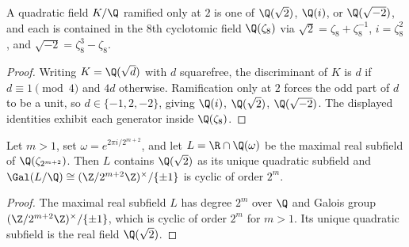 \begin{lemma}
  \label{lem:quadratic-ram-two}
  A quadratic field $K/\Q$ ramified only at $2$ is one of $\Q(\sqrt 2)$,
  $\Q(i)$, or $\Q(\sqrt{-2})$, and each is contained in the $8$th cyclotomic
  field $\Q(\zeta_8)$ via $\sqrt 2 = \zeta_8 + \zeta_8^{-1}$, $i = \zeta_8^2$,
  and $\sqrt{-2} = \zeta_8^3 - \zeta_8$.
\end{lemma}
\begin{proof}
  Writing $K = \Q(\sqrt d)$ with $d$ squarefree, the discriminant of $K$ is $d$
  if $d \equiv 1 \pmod 4$ and $4d$ otherwise. Ramification only at $2$ forces
  the odd part of $d$ to be a unit, so $d \in \{-1, 2, -2\}$, giving $\Q(i)$,
  $\Q(\sqrt 2)$, $\Q(\sqrt{-2})$. The displayed identities exhibit each
  generator inside $\Q(\zeta_8)$.
\end{proof}

\begin{lemma}
  \label{lem:real-subfield-two}
  Let $m > 1$, set $\omega = e^{2\pi i / 2^{m+2}}$, and let $L = \R \cap
  \Q(\omega)$ be the maximal real subfield of $\Q(\zeta_{2^{m+2}})$. Then $L$
  contains $\Q(\sqrt 2)$ as its unique quadratic subfield and $\Gal(L/\Q) \cong
  (\Z/2^{m+2}\Z)^\times / \{\pm 1\}$ is cyclic of order $2^m$.
\end{lemma}
\begin{proof}
  The maximal real subfield $L$ has degree $2^m$ over $\Q$ and Galois group
  $(\Z/2^{m+2}\Z)^\times / \{\pm 1\}$, which is cyclic of order $2^m$ for
  $m > 1$. Its unique quadratic subfield is the real field $\Q(\sqrt 2)$.
\end{proof}

